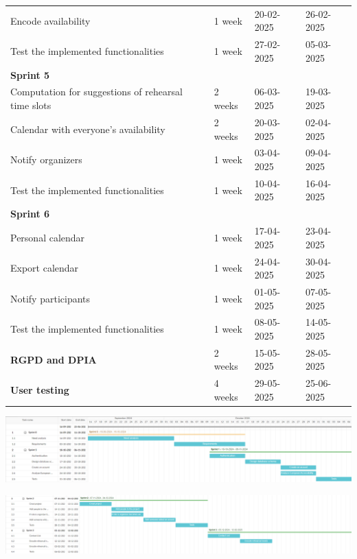 \documentclass[11pt]{article}
\begin{document}
\begin{table}[htbp]
\begin{tabular}{| p{9cm} | p{2cm} | p{2.1cm} | p{2cm} |}
    \quad Encode availability & 1 week & 20-02-2025 & 26-02-2025 \\
    \quad Test the implemented functionalities & 1 week & 27-02-2025 & 05-03-2025\\
    \textbf{Sprint 5} &&&\\
    \quad Computation for suggestions of rehearsal time slots & 2 weeks & 06-03-2025 & 19-03-2025 \\
    \quad Calendar with everyone's availability & 2 weeks & 20-03-2025 & 02-04-2025 \\
    \quad Notify organizers & 1 week & 03-04-2025 & 09-04-2025 \\
    \quad Test the implemented functionalities & 1 week & 10-04-2025 & 16-04-2025\\
    \textbf{Sprint 6} &&&\\
    \quad Personal calendar & 1 week & 17-04-2025 & 23-04-2025 \\
    \quad Export calendar & 1 week & 24-04-2025 & 30-04-2025 \\
    \quad Notify participants & 1 week & 01-05-2025 & 07-05-2025 \\
    \quad Test the implemented functionalities & 1 week & 08-05-2025 & 14-05-2025\\
    \textbf{RGPD and DPIA} & 2 weeks & 15-05-2025 & 28-05-2025 \\
    \textbf{User testing} & 4 weeks & 29-05-2025 & 25-06-2025\\
    \hline
    \end{tabular}
\end{table}

\newpage

\vspace{1cm}
\hspace{-1.5cm}
\includegraphics[scale=0.6]{g1.png}

\vspace{1cm}
\hspace{-1.5cm}
\includegraphics[scale=0.57]{g2.png} 
\end{document}
